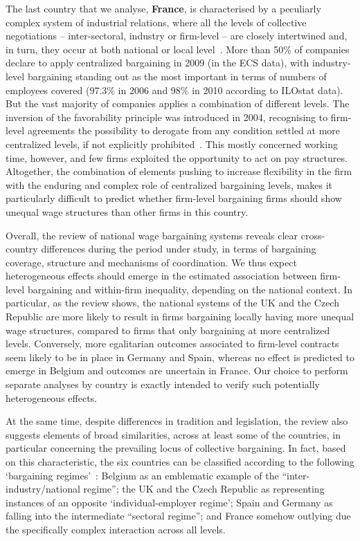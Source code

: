 \documentclass[Review,times,sageh,11pt]{sagej}
\begin{document}
The last country that we analyse, \textbf{France}, is characterised by a peculiarly complex system of industrial relations, where all the levels of collective negotiations -- inter-sectoral, industry or firm-level -- are closely intertwined and, in turn, they occur at both national or local level~\citep{fulton.2013,fulton.2015}.
More than 50\% of companies declare to apply centralized bargaining in 2009 (in the ECS data), with industry-level bargaining standing out as the most important in terms of numbers of employees covered (97.3\% in 2006 and 98\% in 2010 according to ILOstat data). But the vast majority of companies applies a combination of different levels.
The inversion of the favorability principle was introduced in 2004, recognising to firm-level agreements the possibility to derogate from any condition settled at more centralized levels, if not explicitly prohibited~\citep{keune2011decentralizing}.
This mostly concerned working time, however, and few firms exploited the opportunity to act on pay structures. Altogether, the combination of elements pushing to increase flexibility in the firm with the enduring and complex role of centralized bargaining levels, makes it particularly difficult to predict whether firm-level bargaining firms should show unequal wage structures than other firms in this country.

Overall, the review of national wage bargaining systems reveals clear cross-country differences during the period under study, in terms of bargaining coverage, structure and mechanisms of coordination. We thus expect heterogeneous effects should emerge in the estimated association between firm-level bargaining and within-firm inequality, depending on the national context. In particular, as the review shows, the national systems of the UK and the Czech Republic are more likely to result in firms bargaining locally having more unequal wage structures, compared to firms that only bargaining at more centralized levels. Conversely, more egalitarian outcomes associated to firm-level contracts seem likely to be in place in Germany and Spain, whereas no effect is predicted to emerge in Belgium and outcomes are uncertain in France. Our choice to perform separate analyses by country is exactly intended to verify such potentially heterogeneous effects.

At the same time, despite differences in tradition and legislation, the review also suggests elements of broad similarities, across at least some of the countries, in particular concerning the prevailing locus of collective bargaining. In fact, based on this characteristic, the six countries can be classified according to the following ‘bargaining regimes’~\citep[see][]{fulton.2013}: Belgium as an emblematic example of the “inter-industry/national regime”; the UK and the Czech Republic as representing instances of an opposite ‘individual-employer regime’; Spain and Germany as falling into the intermediate “sectoral regime”; and France somehow outlying due the specifically complex interaction across all levels.
\end{document}
